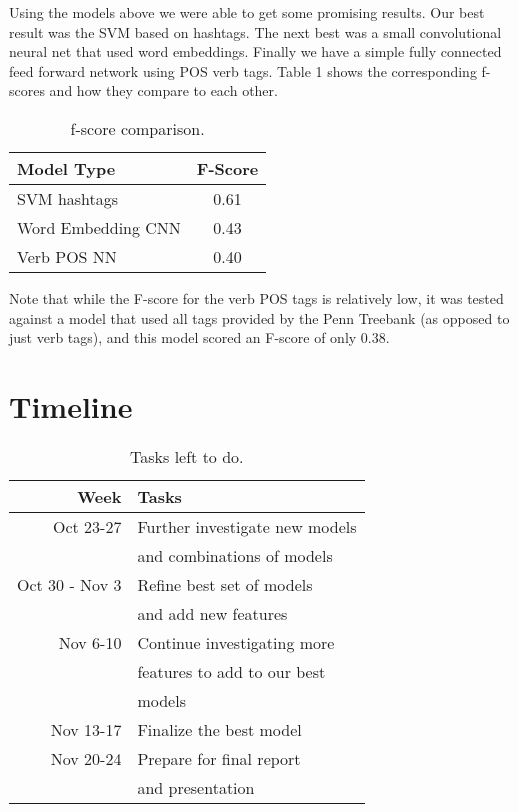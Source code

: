 \documentclass[11pt,letterpaper]{article}
\begin{document}
Using the models above we were able to get some promising results. Our best result was the SVM based on hashtags. The next best was a small convolutional neural net that used word embeddings. Finally we have a simple fully connected feed forward network using POS verb tags. Table 1 shows the corresponding f-scores and how they compare to each other.

\begin{table}[H]
\small
\centering
\begin{tabular}{ |l|c| }
\hline \bf Model Type & \bf F-Score \\ \hline
SVM hashtags & 0.61 \\
Word Embedding CNN & 0.43 \\
Verb POS NN & 0.40 \\
\hline
\end{tabular}
\caption{\label{f-score} f-score comparison.}
\end{table}

Note that while the F-score for the verb POS tags is relatively low, it was tested against a model that used all tags provided by the Penn Treebank (as opposed to just verb tags), and this model scored an F-score of only 0.38.

\section*{Timeline}
\small
\begin{table}[H]
\centering
\begin{tabular}{ r l }
\hline \bf Week & \bf Tasks \\ \hline
Oct 23-27 & Further investigate new models \\
 & and combinations of models \\
Oct 30 - Nov 3 & Refine best set of models \\
 & and add new features \\
Nov 6-10 & Continue investigating more \\
 & features to add to our best \\
 & models \\
Nov 13-17 & Finalize the best model \\
Nov 20-24 & Prepare for final report \\
 & and presentation \\
\hline
\end{tabular}
\caption{\label{timeline} Tasks left to do.}
\end{table}
\end{document}

